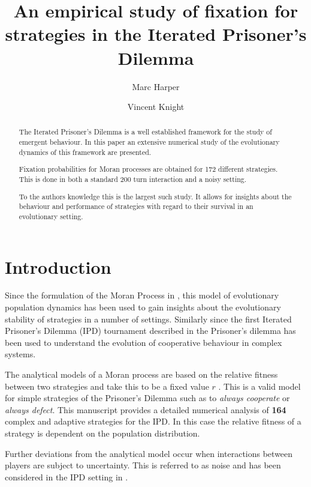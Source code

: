 \documentclass{article}
\title{An empirical study of fixation for strategies in the
       Iterated Prisoner's Dilemma}
\author{Marc Harper \and Vincent Knight} %
\date{}
\begin{document}
\maketitle

\begin{abstract}
    The Iterated Prisoner's Dilemma is a well established framework for
    the study of emergent behaviour. In this paper an extensive numerical
    study of the evolutionary dynamics of this framework are presented.

    Fixation probabilities for Moran processes are obtained for 172
    different strategies. This is done in both a standard 200 turn
    interaction and a noisy setting.

    To the authors knowledge this is the largest
    such study. It allows for insights about the behaviour and
    performance of strategies with regard to their survival in an
    evolutionary setting.
\end{abstract}  %

\section{Introduction}\label{sec:introduction}

Since the formulation of the Moran Process in \cite{Moran1957}, this model of
evolutionary population dynamics has been used to gain insights about the
evolutionary stability of strategies in a number of settings. Similarly since
the first Iterated Prisoner's Dilemma (IPD) tournament described in
\cite{Axelrod1980a} the Prisoner's dilemma has been used to understand the
evolution of cooperative behaviour in complex systems.

The analytical models of a Moran process are based on the relative fitness
between two strategies and take this to be a fixed value \(r\) \cite{Nowak}.
This is a valid model for simple strategies of the Prisoner's Dilemma such as to
\textit{always cooperate} or \textit{always defect}. This manuscript provides a
detailed numerical analysis of \textbf{164} complex and adaptive strategies for
the IPD\@. In this case the relative fitness of a strategy is dependent on the
population distribution.

Further deviations from the analytical model occur when interactions between
players are subject to uncertainty. This is referred to as noise and has been
considered in the IPD setting in \cite{Bendor1993, Nowak1993, Wu1995}.
\end{document}
